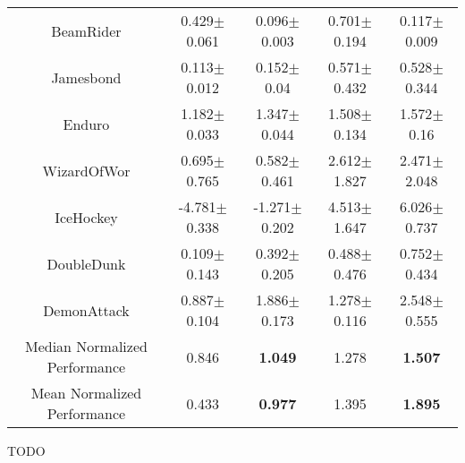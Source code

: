 \begin{table}[t]
\begin{tabular}{ccccc}
BeamRider     &         0.429$\pm$ 0.061 &          0.096$\pm$ 0.003 &             0.701$\pm$ 0.194 &              0.117$\pm$ 0.009 \\
Jamesbond     &         0.113$\pm$ 0.012 &           0.152$\pm$ 0.04 &             0.571$\pm$ 0.432 &              0.528$\pm$ 0.344 \\
Enduro        &         1.182$\pm$ 0.033 &          1.347$\pm$ 0.044 &             1.508$\pm$ 0.134 &               1.572$\pm$ 0.16 \\
WizardOfWor   &         0.695$\pm$ 0.765 &          0.582$\pm$ 0.461 &             2.612$\pm$ 1.827 &              2.471$\pm$ 2.048 \\
IceHockey     &        -4.781$\pm$ 0.338 &         -1.271$\pm$ 0.202 &             4.513$\pm$ 1.647 &              6.026$\pm$ 0.737 \\
DoubleDunk    &         0.109$\pm$ 0.143 &          0.392$\pm$ 0.205 &             0.488$\pm$ 0.476 &              0.752$\pm$ 0.434 \\
DemonAttack   &         0.887$\pm$ 0.104 &          1.886$\pm$ 0.173 &             1.278$\pm$ 0.116 &              2.548$\pm$ 0.555 \\
\midrule
Median Normalized Performance & 0.846 & \textbf{1.049} & 1.278 & \textbf{1.507} \\
Mean Normalized Performance & 0.433 & \textbf{0.977} &  1.395 & \textbf{1.895}  \\
\bottomrule
\end{tabular}

\end{table}

TODO

